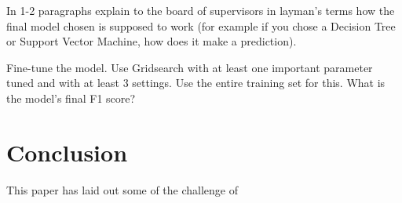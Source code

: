 \documentclass[12pt]{article}
\begin{document}
In 1-2 paragraphs explain to the board of supervisors in layman's terms how the final model chosen is supposed to work (for example if you chose a Decision Tree or Support Vector Machine, how does it make a prediction).

Fine-tune the model. Use Gridsearch with at least one important parameter tuned and with at least 3 settings. Use the entire training set for this.
What is the model's final F1 score?


\section*{Conclusion}

This paper has laid out some of the challenge of 













\end{document}
